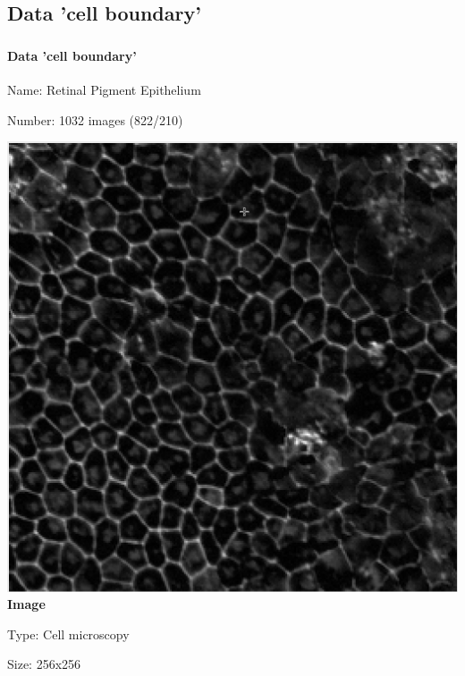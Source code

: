 \def\slidetitle{Data 'cell boundary'}

\subsection{\slidetitle}
\begin{frame}
  \frametitle{\sectiontitle}
  \framesubtitle{\slidetitle}

  \begin{minipage}[h!]{0.40\textwidth}
    Name: Retinal Pigment Epithelium

    Number: 1032 images (822/210)

    \centering
    \includegraphics[scale=0.13]{./img/3_benchmark/image.png}
    \textbf{Image}
  \end{minipage}\hfill
  \begin{minipage}[h!]{0.40\textwidth}
    Type: Cell microscopy

    Size: 256x256


\end{minipage}
\end{frame}
